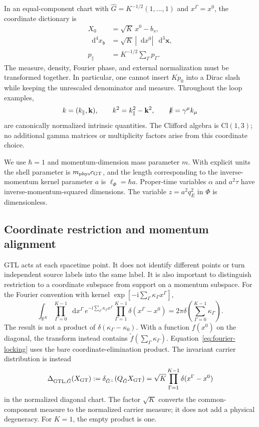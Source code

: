 \documentclass[final,5p,times,twocolumn,numbers,nopreprintline]{elsarticle}
\numberwithin{equation}{section}
\theoremstyle{definition}
\theoremstyle{remark}
\newcommand{\dd}{\mathop{}\!\mathrm d}
\newcommand{\ii}{\mathrm i}
\newcommand{\bb}{\mathfrak b}
\newcommand{\Ph}{\Phi}
\newcommand{\RR}{\mathbb R}
\newcommand{\cGT}{c_{\mathrm{GT}}}
\begin{document}
In an equal-component chart with
\(\hat G=K^{-1/2}(1,\ldots,1)\) and
\(x^\Gamma=x^0\), the coordinate dictionary is
\[
\begin{aligned}
 X_0&=\sqrt K\,x^0-b_s,\\
 \dd^4x_{\bb}&=\sqrt K\,|\dd x^0|\,\dd^3\mathbf x,\\
 p_\parallel&=K^{-1/2}\sum_\Gamma p_\Gamma.
\end{aligned}
\]
The measure, density, Fourier phase, and external normalization must be
transformed together. In particular, one cannot insert \(Kp_0\)
into a Dirac slash while keeping the unrescaled denominator and measure.
Throughout the loop examples,
\begin{equation}
 k=(k_\parallel,\mathbf k),\qquad
 k^2=k_\parallel^2-\mathbf k^2,\qquad
 \slashed k=\gamma^\mu k_\mu
 \label{eq:intrinsic-momentum}
\end{equation}
are canonically normalized intrinsic quantities. The Clifford algebra
is \(\mathrm{Cl}(1,3)\); no additional gamma matrices or multiplicity
factors arise from this coordinate choice.

We use \(\hbar=1\) and momentum-dimension mass parameter \(m\). With
explicit units the shell parameter is \(m_{\rm phys}\cGT\), and the
length corresponding to the inverse-momentum kernel parameter \(a\)
is \(\ell_{\Ph}=\hbar a\). Proper-time variables
\(\alpha\) and \(a^2\tau\) have inverse-momentum-squared dimensions.
The variable \(z=a^2q_E^2\) in \(\Ph\) is dimensionless.

\subsection{Coordinate restriction and momentum alignment}
\label{sec:fourier-locking}

GTL acts at each spacetime point. It does not identify different points
or turn independent source labels into the same label. It is also
important to distinguish restriction to a coordinate subspace from
support on a momentum subspace. For the Fourier convention with
kernel \(\exp[-\ii\sum_\Gamma\kappa_\Gamma x^\Gamma]\),
\begin{equation}
 \int_{\RR^K}\prod_{\Gamma=0}^{K-1}\dd x^\Gamma\,
 e^{-\ii\sum_\Gamma\kappa_\Gamma x^\Gamma}
 \prod_{\Gamma=1}^{K-1}\delta(x^\Gamma-x^0)
 =2\pi\delta\!\left(\sum_{\Gamma=0}^{K-1}\kappa_\Gamma\right).
 \label{eq:fourier-locking}
\end{equation}
The result is not a product of
\(\delta(\kappa_\Gamma-\kappa_0)\).
With a function \(f(x^0)\) on the diagonal, the transform instead
contains \(\widetilde f(\sum_\Gamma\kappa_\Gamma)\).
Equation~\eqref{eq:fourier-locking} uses the bare coordinate-elimination
product. The invariant carrier distribution is instead
\[
 \Delta_{{\rm GTL},\hat G}(X_{\rm GT})
 :=\delta_{\hat G^\perp}(Q_{\hat G}X_{\rm GT})
 =\sqrt K\prod_{\Gamma=1}^{K-1}\delta(x^\Gamma-x^0)
\]
in the normalized diagonal chart. The factor \(\sqrt K\) converts
the common-component measure to the normalized carrier measure; it
does not add a physical degeneracy. For \(K=1\), the empty product
is one.
\end{document}
